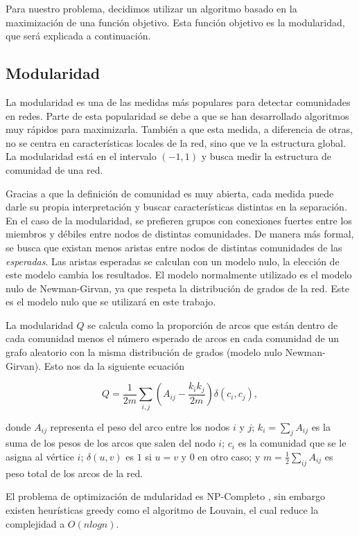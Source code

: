 \documentclass[conference]{IEEEtran}
\begin{document}
Para nuestro problema, decidimos utilizar un algoritmo basado en la maximización de una función objetivo. Esta función objetivo es la modularidad, que será explicada a continuación. 




\subsection{Modularidad}

La modularidad es una de las medidas más populares para detectar comunidades en redes. Parte de esta popularidad se debe a que se han desarrollado algoritmos muy rápidos para maximizarla. También a que esta medida, a diferencia de otras, no se centra en características locales de la red, sino que ve la estructura global. La modularidad está en el intervalo $(-1,1)$ y busca medir la estructura de comunidad de una red.

Gracias a que la definición de comunidad es muy abierta, cada medida puede darle su propia interpretación y buscar características distintas en la separación. En el caso de la modularidad, se prefieren grupos con conexiones fuertes entre los miembros y débiles entre nodos de distintas comunidades. De manera más formal, se busca que existan menos aristas entre nodos de distintas comunidades de las \textit{esperadas}. Las aristas esperadas se calculan con un modelo nulo, la elección de este modelo cambia los resultados. El modelo normalmente utilizado es el modelo nulo de Newman-Girvan, ya que respeta la distribución de grados de la red. Este es el modelo nulo que se utilizará en este trabajo.

La modularidad $Q$ se calcula como la proporción de arcos que están dentro de cada comunidad menos el número esperado de arcos en cada comunidad de un grafo aleatorio con la misma distribución de grados (modelo nulo Newman-Girvan). Esto nos da la siguiente ecuación \cite{blondel_fast_2008}

\[
    Q = \frac{1}{2m} \sum_{i,j} (A_{ij} - \frac{k_i k_j}{2m}) \delta (c_i, c_j),
\]

donde $A_{ij}$ representa el peso del arco entre los nodos $i$ y $j$; $k_i = \sum_j A_{ij}$ es la suma de los pesos de los arcos que salen del nodo $i$; $c_i$ es la comunidad que se le asigna al vértice $i$; $\delta(u,v)$ es $1$ si $u=v$ y $0$ en otro caso; y $m = \frac{1}{2} \sum_{ij} A_{ij}$ es peso total de los arcos de la red.

El problema de optimización de mdularidad es NP-Completo \cite{blondel_fast_2008}, sin embargo existen heurísticas greedy como el algoritmo de Louvain, el cual reduce la complejidad a $O(nlogn)$\cite{blondel_fast_2008}.
\end{document}

